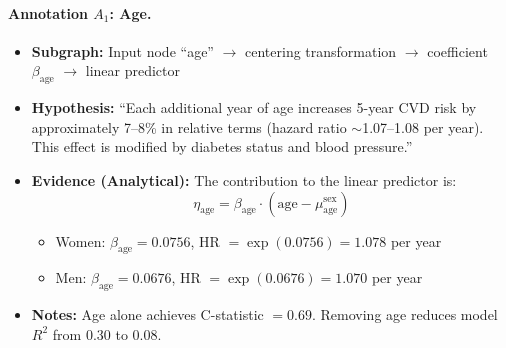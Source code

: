 \documentclass{article}
\begin{document}
\paragraph{Annotation $A_1$: Age.}
\begin{itemize}
    \item \textbf{Subgraph:} Input node ``age'' $\rightarrow$ centering transformation $\rightarrow$ coefficient $\beta_{\text{age}}$ $\rightarrow$ linear predictor
    \item \textbf{Hypothesis:} ``Each additional year of age increases 5-year CVD risk by approximately 7--8\% in relative terms (hazard ratio $\sim$1.07--1.08 per year). This effect is modified by diabetes status and blood pressure.''
    \item \textbf{Evidence (Analytical):} The contribution to the linear predictor is:
    \[
    \eta_{\text{age}} = \beta_{\text{age}} \cdot (\text{age} - \mu_{\text{age}}^{\text{sex}})
    \]
    \begin{itemize}
        \item Women: $\beta_{\text{age}} = 0.0756$, HR $= \exp(0.0756) = 1.078$ per year
        \item Men: $\beta_{\text{age}} = 0.0676$, HR $= \exp(0.0676) = 1.070$ per year
    \end{itemize}
    \item \textbf{Notes:} Age alone achieves C-statistic $= 0.69$. Removing age reduces model $R^2$ from 0.30 to 0.08.
\end{itemize}
\end{document}
